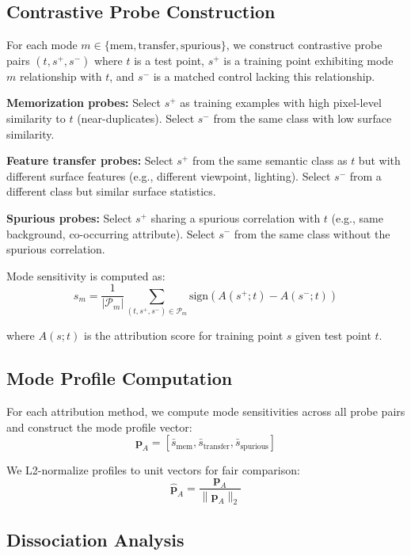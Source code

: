 \subsection{Contrastive Probe Construction}

For each mode $m \in \{\text{mem}, \text{transfer}, \text{spurious}\}$, we construct contrastive probe pairs $(t, s^+, s^-)$ where $t$ is a test point, $s^+$ is a training point exhibiting mode $m$ relationship with $t$, and $s^-$ is a matched control lacking this relationship.

\textbf{Memorization probes:} Select $s^+$ as training examples with high pixel-level similarity to $t$ (near-duplicates). Select $s^-$ from the same class with low surface similarity.

\textbf{Feature transfer probes:} Select $s^+$ from the same semantic class as $t$ but with different surface features (e.g., different viewpoint, lighting). Select $s^-$ from a different class but similar surface statistics.

\textbf{Spurious probes:} Select $s^+$ sharing a spurious correlation with $t$ (e.g., same background, co-occurring attribute). Select $s^-$ from the same class without the spurious correlation.

Mode sensitivity is computed as:
\begin{equation}
s_m = \frac{1}{|\mathcal{P}_m|} \sum_{(t, s^+, s^-) \in \mathcal{P}_m} \text{sign}(A(s^+; t) - A(s^-; t))
\end{equation}

where $A(s; t)$ is the attribution score for training point $s$ given test point $t$.

\subsection{Mode Profile Computation}

For each attribution method, we compute mode sensitivities across all probe pairs and construct the mode profile vector:
\begin{equation}
\mathbf{p}_A = \left[\bar{s}_\text{mem}, \bar{s}_\text{transfer}, \bar{s}_\text{spurious}\right]
\end{equation}

We L2-normalize profiles to unit vectors for fair comparison:
\begin{equation}
\hat{\mathbf{p}}_A = \frac{\mathbf{p}_A}{\|\mathbf{p}_A\|_2}
\end{equation}

\subsection{Dissociation Analysis}

